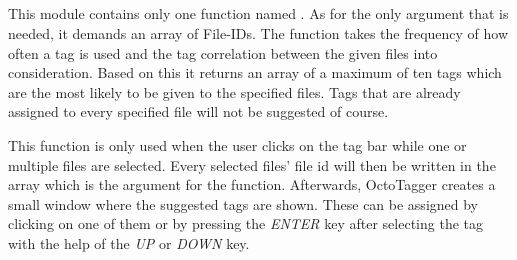 \subsection{}
\label{sub:mod:suggestion}
\def\kapitelautor{Christoph Führer}

This module contains only one function named . As for the only argument that is needed, it demands an array of File-IDs. The function takes the frequency of how often a tag is used and the tag correlation between the given files into consideration. Based on this it returns an array of a maximum of ten tags which are the most likely to be given to the specified files. Tags that are already assigned to every specified file will not be suggested of course.

This function is only used when the user clicks on the tag bar while one or multiple files are selected. Every selected files' file id will then be written in the array which is the argument for the function. Afterwards, OctoTagger creates a small window where the suggested tags are shown. These can be assigned by clicking on one of them or by pressing the \textit{ENTER} key after selecting the tag with the help of the \textit{UP} or \textit{DOWN} key.

